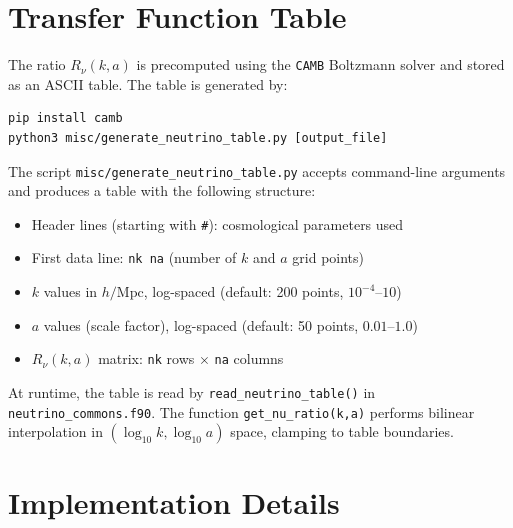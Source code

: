 \documentclass[11pt,fleqn]{book}
\begin{document}
\section{Transfer Function Table}

The ratio $R_\nu(k,a)$ is precomputed using the \texttt{CAMB} Boltzmann
solver and stored as an ASCII table.  The table is generated by:

\begin{codebox}
\begin{lstlisting}[style=fortran,numbers=none]
pip install camb
python3 misc/generate_neutrino_table.py [output_file]
\end{lstlisting}
\end{codebox}

\noindent
The script \texttt{misc/generate\_neutrino\_table.py} accepts command-line
arguments and produces a table with the following structure:

\begin{itemize}[nosep]
  \item Header lines (starting with \texttt{\#}): cosmological parameters used
  \item First data line: \texttt{nk  na} (number of $k$ and $a$ grid points)
  \item $k$ values in $h/\text{Mpc}$, log-spaced (default: 200 points, $10^{-4}$--$10$)
  \item $a$ values (scale factor), log-spaced (default: 50 points, $0.01$--$1.0$)
  \item $R_\nu(k,a)$ matrix: \texttt{nk} rows $\times$ \texttt{na} columns
\end{itemize}

At runtime, the table is read by \texttt{read\_neutrino\_table()} in
\texttt{neutrino\_commons.f90}.  The function \texttt{get\_nu\_ratio(k,a)}
performs bilinear interpolation in $(\log_{10} k, \log_{10} a)$ space,
clamping to table boundaries.

\section{Implementation Details}
\end{document}
